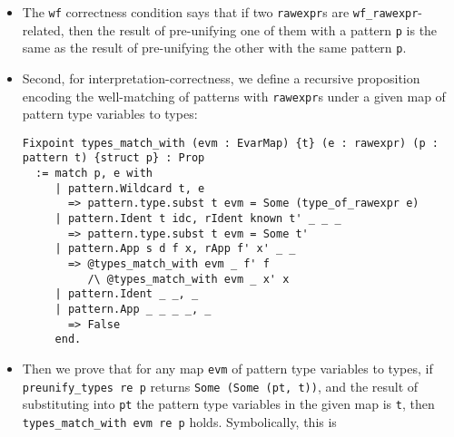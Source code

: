 \begin{itemize}
\begin{itemize}
\begin{itemize}
\begin{itemize}
        \begin{itemize}
        \item
          The \texttt{wf} correctness condition says that if two
          \texttt{rawexpr}s are \texttt{wf\_rawexpr}-related, then the
          result of pre-unifying one of them with a pattern \texttt{p}
          is the same as the result of pre-unifying the other with the
          same pattern \texttt{p}.
        \item
          Second, for interpretation-correctness, we define a recursive
          proposition encoding the well-matching of patterns with
          \texttt{rawexpr}s under a given map of pattern type variables
          to types:

\begin{verbatim}
Fixpoint types_match_with (evm : EvarMap) {t} (e : rawexpr) (p : pattern t) {struct p} : Prop
  := match p, e with
     | pattern.Wildcard t, e
       => pattern.type.subst t evm = Some (type_of_rawexpr e)
     | pattern.Ident t idc, rIdent known t' _ _ _
       => pattern.type.subst t evm = Some t'
     | pattern.App s d f x, rApp f' x' _ _
       => @types_match_with evm _ f' f
          /\ @types_match_with evm _ x' x
     | pattern.Ident _ _, _
     | pattern.App _ _ _ _, _
       => False
     end.
\end{verbatim}
        \item
          Then we prove that for any map \texttt{evm} of pattern type
          variables to types, if \texttt{preunify\_types\ re\ p} returns
          \texttt{Some\ (Some\ (pt,\ t\textquotesingle{}))}, and the
          result of substituting into \texttt{pt} the pattern type
          variables in the given map is \texttt{t\textquotesingle{}},
          then \texttt{types\_match\_with\ evm\ re\ p} holds.
          Symbolically, this is


\end{itemize}
\end{itemize}
\end{itemize}
\end{itemize}
\end{itemize}
